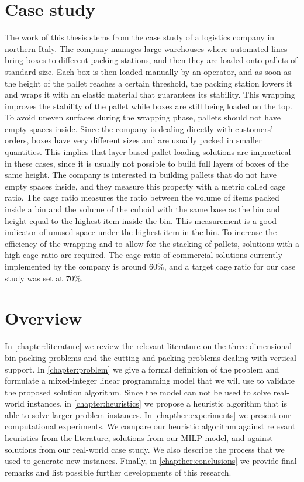 \section{Case study}
\label{sec:intro:case_study}%
The work of this thesis stems from the case study of a logistics company in northern Italy.
The company manages large warehouses where automated lines bring boxes to different packing stations, and then they are loaded onto pallets of standard size.
Each box is then loaded manually by an operator, and as soon as the height of the pallet reaches a certain threshold, the packing station lowers it and wraps it with an elastic material that guarantees its stability.
This wrapping improves the stability of the pallet while boxes are still being loaded on the top. To avoid uneven surfaces during the wrapping phase, pallets should not have empty spaces inside.
Since the company is dealing directly with customers' orders, boxes have very different sizes and are usually packed in smaller quantities. This implies that layer-based pallet loading solutions are impractical in these cases, since it is usually not possible to build full layers of boxes of the same height.
The company is interested in building pallets that do not have empty spaces inside, and they measure this property with a metric called cage ratio.
The cage ratio measures the ratio between the volume of items packed inside a bin and the volume of the cuboid with the same base as the bin and height equal to the highest item inside the bin.
This measurement is a good indicator of unused space under the highest item in the bin.
To increase the efficiency of the wrapping and to allow for the stacking of pallets, solutions with a high cage ratio are required.
The cage ratio of commercial solutions currently implemented by the company is around $60\%$, and a target cage ratio for our case study was set at $70\%$.

\newpage
\section{Overview}
\label{sec:intro:overview}%
In \cref{chapter:literature} we review the relevant literature on the three-dimensional bin packing problems and the cutting and packing problems dealing with vertical support.
In \cref{chapter:problem} we give a formal definition of the problem and formulate a mixed-integer linear programming model that we will use to validate the proposed solution algorithm.
Since the model can not be used to solve real-world instances, in \cref{chapter:heuristics} we propose a heuristic algorithm that is able to solve larger problem instances.
In \cref{chapther:experiments} we present our computational experiments. We compare our heuristic algorithm against relevant heuristics from the literature, solutions from our MILP model, and against solutions from our real-world case study. We also describe the process that we used to generate new instances.
Finally, in \cref{chapther:conclusions} we provide final remarks and list possible further developments of this research.